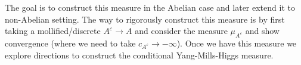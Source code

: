 \documentclass[11pt]{article}
\numberwithin{equation}{section}
\theoremstyle{definition}
\theoremstyle{remark}
\newcommand{\1}{\mathbf 1}
\newcommand{\<}{\langle}
\renewcommand{\>}{\rangle}
\newcommand{\orange}[1]{\textcolor{orange}{#1}}
\newcommand{\rmD}{\mathrm{D}}
\begin{document}
The goal is to construct this measure in the Abelian case and later extend it to non-Abelian setting. The way to rigorously construct this measure is by first taking a mollified/discrete $A^\varepsilon\to A$ and consider the measure $\mu_{A^\varepsilon}$ and show convergence (where we need to take $c_{A^\varepsilon}\to-\infty$). Once we have this measure we explore directions to construct the conditional Yang-Mills-Higgs measure.  





%
%

\end{document}
